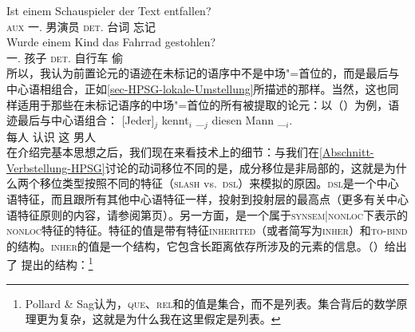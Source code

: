 \ex 
\gll Ist einem Schauspieler der Text entfallen?\\
      \textsc{aux}  一.\dat{} 男演员     \textsc{det}.\nom{} 台词 忘记\\
\ex
\gll Wurde einem Kind das Fahrrad gestohlen?\\
     \passivepst{} 一.\dat{} 孩子 \textsc{det}.\nom{} 自行车 偷\\
\zl
所以，我认为前置论元的语迹在未标记的语序中不是中场"=首位的，而是最后与中心语相组合，正如\ref{sec-HPSG-lokale-Umstellung}所描述的那样。当然，这也同样适用于那些在未标记语序的中场"=首位的所有被提取的论元：以（）为例，语迹最后与中心语组合：
\ea
\label{Beispiel-jeder-kennt-diesen-Mann-HPSG}
\gll {}[Jeder]$_j$ kennt$_i$ \_$_j$ diesen Mann \_$_i$.\\
	 {}\spacebr{}每人 认识 {} 这 男人\\
\z
在介绍完基本思想之后，我们现在来看技术上的细节：与我们在\ref{Abschnitt-Verbstellung-HPSG}讨论的动词移位不同的是，成分移位是非局部的，这就是为什么两个移位类型按照不同的特征（\textsc{slash} vs.\ \textsc{dsl}）来模拟的原因。\textsc{dsl}是一个中心语特征，而且跟所有其他中心语特征一样，投射到投射层的最高点（更多有关中心语特征原则的内容，请参阅第\pageref{prinzip-hfp}页）。另一方面，\slaschc 是一个属于\textsc{synsem|nonloc}下表示的\textsc{nonloc}特征的特征。\nonlocc 特征的值是带有特征\textsc{inherited}（或者简写为\textsc{inher}）和\textsc{to-bind}的结构。\textsc{inher}的值是一个结构，它包含长距离依存所涉及的元素的信息。（）给出了 \citet[]{ps2}提出的结构：\footnote{%
Pollard \& Sag认为，\textsc{que}、\textsc{rel}和\slaschc 的值是集合，而不是列表。集合背后的数学原理更为复杂，这就是为什么我在这里假定是列表。
}
